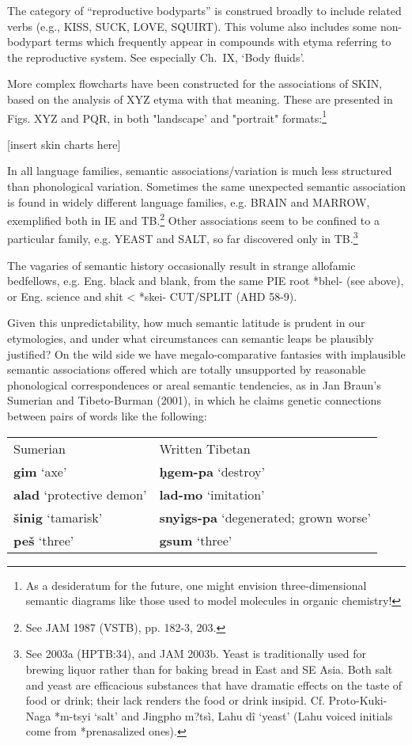 The category of “reproductive bodyparts” is construed broadly to include
related verbs (e.g., KISS, SUCK, LOVE, SQUIRT). This volume also includes some
non-bodypart terms which frequently appear in compounds with etyma referring to
the reproductive system.  See especially Ch.~IX, ‘Body fluids’.



More complex flowcharts have been constructed for the associations of SKIN, based on the analysis of XYZ etyma with that meaning. These are presented in Figs. XYZ and PQR, in both "landscape' and "portrait" formats:\footnote{As a desideratum for the future, one might envision three-dimensional semantic diagrams like those used to model molecules in organic chemistry!}

[insert skin charts here]

In all language families, semantic associations/variation is much less structured than phonological variation. Sometimes the same unexpected semantic association is found in widely different language families, e.g. BRAIN and MARROW, exemplified both in IE and TB.\footnote{See JAM 1987 (VSTB), pp. 182-3, 203.} Other associations seem to be confined to a particular family, e.g. YEAST and SALT, so far discovered only in TB.\footnote{See 2003a (HPTB:34), and JAM 2003b. Yeast is traditionally used for brewing liquor rather than for baking bread in East and SE Asia. Both salt and yeast are efficacious substances that have dramatic effects on the taste of food or drink; their lack renders the food or drink insipid. Cf. Proto-Kuki-Naga *m-tsyi ‘salt’ and Jingpho m?tsì, Lahu dî ‘yeast’ (Lahu voiced initials come from *prenasalized ones).}

The vagaries of semantic history occasionally result in strange allofamic bedfellows, e.g. Eng. black and blank, from the same PIE root *bhel- (see above), or Eng. science and shit < *skei- CUT/SPLIT (AHD 58-9).

Given this unpredictability, how much semantic latitude is prudent in
our etymologies, and under what circumstances can semantic leaps be
plausibly justified? On the wild side we have megalo-comparative
fantasies with implausible semantic associations offered which are
totally unsupported by reasonable phonological correspondences or
areal semantic tendencies, as in Jan Braun’s Sumerian and
Tibeto-Burman (2001), in which he claims genetic connections between
pairs of words like the following:

\begin{tabular}{l l}
		Sumerian		&		Written Tibetan\\
		\textbf{gim} ‘axe’		&		\textbf{ḥgem-pa} ‘destroy’\\
		\textbf{alad} ‘protective demon’	&	\textbf{lad-mo} ‘imitation’\\
		\textbf{šinig} ‘tamarisk’	&		\textbf{snyigs-pa} ‘degenerated; grown worse’\\
		\textbf{peš} ‘three’	&		\textbf{gsum} ‘three’\\
\end{tabular}

